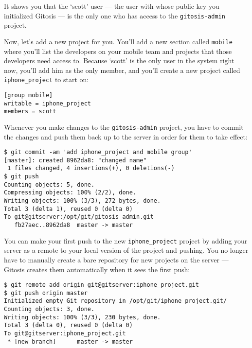 \documentclass[a4paper]{book}
\newcounter{tab}[chapter]
\begin{document}
It shows you that the `scott' user --- the user with whose public key you initialized Gitosis --- is the only one who has access to the \texttt{gitosis-admin} project.

Now, let's add a new project for you. You'll add a new section called \texttt{mobile} where you'll list the developers on your mobile team and projects that those developers need access to. Because `scott' is the only user in the system right now, you'll add him as the only member, and you'll create a new project called \texttt{iphone\_project} to start on:

\begin{shaded}\begin{verbatim}
[group mobile]
writable = iphone_project
members = scott
\end{verbatim}\end{shaded}

Whenever you make changes to the \texttt{gitosis-admin} project, you have to commit the changes and push them back up to the server in order for them to take effect:

\begin{shaded}\begin{verbatim}
$ git commit -am 'add iphone_project and mobile group'
[master]: created 8962da8: "changed name"
 1 files changed, 4 insertions(+), 0 deletions(-)
$ git push
Counting objects: 5, done.
Compressing objects: 100% (2/2), done.
Writing objects: 100% (3/3), 272 bytes, done.
Total 3 (delta 1), reused 0 (delta 0)
To git@gitserver:/opt/git/gitosis-admin.git
   fb27aec..8962da8  master -> master
\end{verbatim}\end{shaded}

You can make your first push to the new \texttt{iphone\_project} project by adding your server as a remote to your local version of the project and pushing. You no longer have to manually create a bare repository for new projects on the server --- Gitosis creates them automatically when it sees the first push:

\begin{shaded}\begin{verbatim}
$ git remote add origin git@gitserver:iphone_project.git
$ git push origin master
Initialized empty Git repository in /opt/git/iphone_project.git/
Counting objects: 3, done.
Writing objects: 100% (3/3), 230 bytes, done.
Total 3 (delta 0), reused 0 (delta 0)
To git@gitserver:iphone_project.git
 * [new branch]      master -> master
\end{verbatim}\end{shaded}
\end{document}
